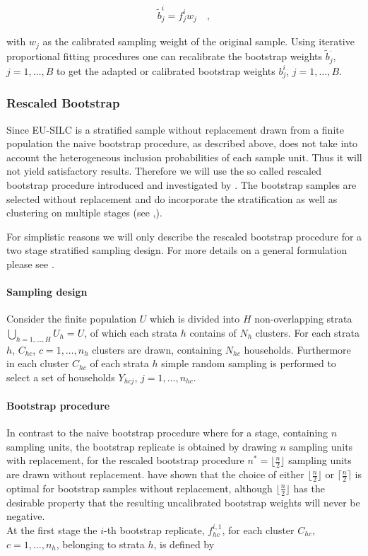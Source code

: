 \documentclass{scrartcl}\usepackage[]{graphicx}\usepackage[]{color}
\begin{document}
\begin{align*}
  \tilde{b}_{j}^{i} = f_j^{i} w_j \quad,
\end{align*}

with $w_j$ as the calibrated sampling weight of the original sample.
Using iterative proportional fitting procedures one can recalibrate the bootstrap weights $\tilde{b}_{j}^{.}$, $j=1,\ldots,B$ to get the adapted or calibrated bootstrap weights $b_j^i$, $j=1,\ldots,B$.

\subsubsection{Rescaled Bootstrap}
Since EU-SILC is a stratified sample without replacement drawn from a finite population the naive bootstrap procedure, as described above, does not take into account the heterogeneous inclusion probabilities of each sample unit. Thus it will not yield satisfactory results. Therefore we will use the so called rescaled bootstrap procedure introduced and investigated by \citep{raowu1988}. The bootstrap samples are selected without replacement and do incorporate the stratification as well as clustering on multiple stages (see \citep{chipprest2007},\citep{prest2009}).\\
\newline

For simplistic reasons we will only describe the rescaled bootstrap procedure for a two stage stratified sampling design. For more details on a general formulation please see \citep{prest2009}.

\paragraph{Sampling design}
Consider the finite population $U$ which is divided into $H$ non-overlapping strata $\bigcup\limits_{h=1,\ldots,H} U_h = U$, of which each strata $h$ contains of $N_h$ clusters. For each strata $h$, $C_{hc}$, $c=1,\ldots,n_h$ clusters are drawn, containing $N_{hc}$ households. Furthermore in each cluster $C_{hc}$ of each strata $h$ simple random sampling is performed to select a set of households $Y_{hcj}$, $j=1,\ldots,n_{hc}$.

\paragraph{Bootstrap procedure}
In contrast to the naive bootstrap procedure where for a stage, containing $n$ sampling units, the bootstrap replicate is obtained by drawing $n$ sampling units with replacement, for the rescaled bootstrap procedure $n^*=\lfloor\frac{n}{2}\rfloor$ sampling units are drawn without replacement. \citep{chipprest2007} have shown that the choice of either $\lfloor\frac{n}{2}\rfloor$ or $\lceil\frac{n}{2}\rceil$ is optimal for bootstrap samples without replacement, although $\lfloor\frac{n}{2}\rfloor$ has the desirable property that the resulting uncalibrated bootstrap weights will never be negative.\\
\newline
At the first stage the $i$-th bootstrap replicate, $f^{i,1}_{hc}$, for each cluster $C_{hc}$,$c=1,\ldots,n_h$, belonging to strata $h$, is defined by
\end{document}
